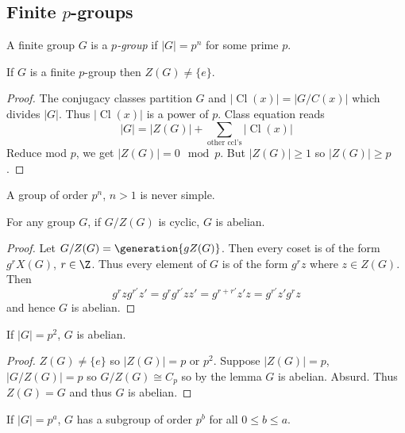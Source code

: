 \documentclass[a4paper]{article}
\theoremstyle{definition}
\DeclareMathOperator{\Cl}{Cl}
\begin{document}
\subsection{Finite \texorpdfstring{\(p\)}{p}-groups}

A finite group \(G\) is a \emph{\(p\)-group} if \(|G| = p^n\) for some prime \(p\).

\begin{theorem}
  If \(G\) is a finite \(p\)-group then \(Z(G) \neq \{e\}\).
\end{theorem}

\begin{proof}
  The conjugacy classes partition \(G\) and \(|\Cl(x)| = |G/C(x)|\) which divides \(|G|\). Thus \(|\Cl(x)|\) is a power of \(p\). Class equation reads
  \[
    |G| = |Z(G)| + \sum_{\text{other ccl's}} |\Cl(x)|
  \]
  Reduce mod \(p\), we get \(|Z(G)| = 0 \mod p\). But \(|Z(G)| \geq 1\) so \(|Z(G)| \geq p\).
\end{proof}

\begin{corollary}
  A group of order \(p^n\), \(n > 1\) is never simple.
\end{corollary}

\begin{lemma}
  For any group \(G\), if \(G/Z(G)\) is cyclic, \(G\) is abelian.
\end{lemma}

\begin{proof}
  Let \(G/Z(G) = \generation{gZ(G)}\). Then every coset is of the form \(g^rX(G)\), \(r \in \Z\). Thus every element of \(G\) is of the form \(g^rz\) where \(z \in Z(G)\). Then
  \[
    g^rzg^{r'}z' = g^rg^{r'}zz' = g^{r + r'} z'z = g^{r'}z'g^rz
  \]
  and hence \(G\) is abelian.
\end{proof}

\begin{corollary}
  If \(|G| = p^2\), \(G\) is abelian.
\end{corollary}

\begin{proof}
  \(Z(G) \neq \{e\}\) so \(|Z(G)| = p\) or \(p^2\). Suppose \(|Z(G)| = p\), \(|G/Z(G)| = p\) so \(G/Z(G) \cong C_p\) so by the lemma \(G\) is abelian. Absurd. Thus \(Z(G) = G\) and thus \(G\) is abelian.
\end{proof}

\begin{theorem}
  If \(|G| = p^a\), \(G\) has a subgroup of order \(p^b\) for all \(0 \leq b \leq a\).
\end{theorem}
\end{document}
